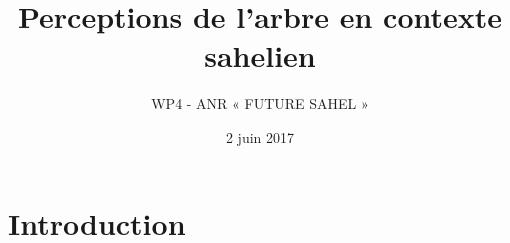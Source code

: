 \documentclass[newPxFont]{beamer}
\title{Perceptions de l’arbre en contexte sahelien}
\subtitle{WP4 - ANR « FUTURE SAHEL »}
\date{2 juin 2017}
\institute{Réunion mi-parcours ANR (Dakar - Sénégal)}
\begin{document}
%
%

\maketitle


%
%


\section{Introduction}
\end{document}
